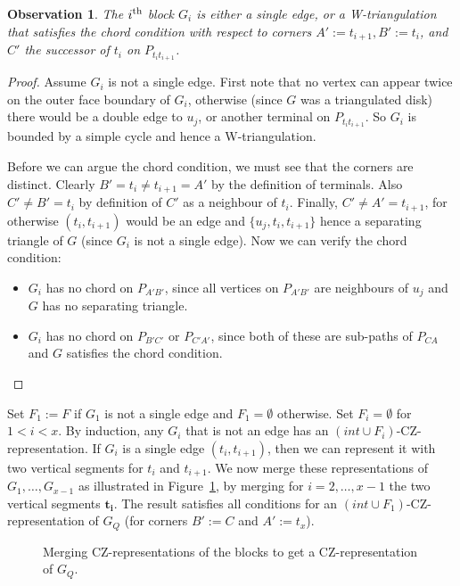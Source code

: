\documentclass{article}
\renewcommand{\int}[1]{$(\mathit{int}\cup{#1})$}
\newcommand{\bb}[1]{\ensuremath{\mathbf{#1}}}
\newtheorem{observation}[theorem]{Observation}
\begin{document}
\begin{observation}
\label{obs:chain-block}
The $i^{\mbox{\scriptsize{th}}}$ block $G_i$ is either a single edge, or a W-triangulation
that satisfies the chord condition with respect to corners
$A' := t_{i+1}, B' := t_{i}$, and $C'$ the successor of $t_i$ on $P_{t_i t_{i+1}}$.
\end{observation}
\begin{proof}
Assume $G_i$ is not a single edge.  First note that no vertex can appear twice
on the outer face boundary of $G_i$, otherwise (since $G$ was a triangulated disk)
there would be a double edge to $u_j$, or another terminal on $P_{t_i t_{i+1}}$.
So $G_i$ is bounded by a simple cycle and hence a W-triangulation.

Before we can argue the chord condition, we must see that the corners are
distinct.  Clearly $B'=t_i\neq t_{i+1}=A'$ by the definition of terminals.
Also $C'\neq B'=t_i$ by definition of $C'$ as a neighbour of $t_i$.  
Finally, $C'\neq A'=t_{i+1}$, for otherwise $(t_i,t_{i+1})$ would be an
edge and $\{u_j,t_i,t_{i+1}\}$ hence a separating triangle of $G$ (since
$G_i$ is not a single edge).  Now we can verify the chord condition:
\begin{itemize}
\item $G_i$ has no chord on $P_{A' B'}$, since all vertices on $P_{A' B'}$ are 
	neighbours of $u_j$ and $G$ has no separating triangle.  
\item $G_i$ has no chord on $P_{B' C'}$ or $P_{C' A'}$, since both of
	these are sub-paths of $P_{CA}$ and $G$ satisfies the chord
	condition.
\end{itemize}
\end{proof}

Set $F_1:=F$ if $G_1$ is not a single edge and $F_1=\emptyset$ otherwise.
Set $F_i=\emptyset$ for $1<i<x$.  By induction, any $G_i$
that is not an edge has an \int{F_i}-CZ-representation.
If $G_i$ is a single edge $(t_i,t_{i+1})$, then we can represent it with two
vertical segments for $t_i$ and $t_{i+1}$.  We now merge these representations
of $G_1,\dots,G_{x-1}$ as illustrated in Figure~\ref{fig:chain-representation},
by merging for $i=2,\dots,x-1$ the two vertical segments $\bb{t_i}$.
The result satisfies all conditions for an 
\int{F_1}-CZ-representation 
of $G_Q$ (for corners $B':=C$ and $A':=t_x$).


\begin{figure}
    \centering
{}
\raisebox{-0.5\height}{~~~$\rightarrow$~~~}
    \caption{Merging CZ-representations of the blocks to get a CZ-representation
of $G_Q$.}
    \label{fig:chain-representation}
\end{figure}
\end{document}
